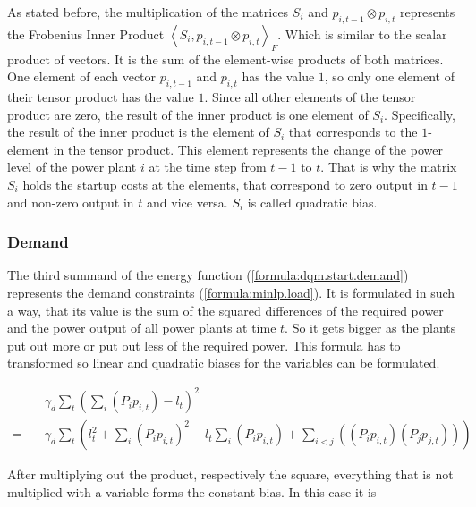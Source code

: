 As stated before, the multiplication of the matrices $S_i$ and $p_{i, t-1} \otimes p_{i, t}$ represents the Frobenius Inner Product $\left\langle S_i, p_{i, t-1} \otimes p_{i, t} \right\rangle_F$.
Which is similar to the scalar product of vectors.
It is the sum of the element-wise products of both matrices.
One element of each vector $p_{i, t-1}$ and $p_{i, t}$ has the value $1$, so only one element of their tensor product has the value $1$.
Since all other elements of the tensor product are zero, the result of the inner product is one element of $S_i$.
Specifically, the result of the inner product is the element of $S_i$ that corresponds to the $1$-element in the tensor product.
This element represents the change of the power level of the power plant $i$ at the time step from $t-1$ to $t$.
That is why the matrix $S_i$ holds the startup costs at the elements, that correspond to zero output in $t-1$ and non-zero output in $t$ and vice versa.
$S_i$ is called quadratic bias.

\subsubsection{Demand}

The third summand of the energy function (\ref{formula:dqm.start.demand}) represents the demand constraints (\ref{formula:minlp.load}).
It is formulated in such a way, that its value is the sum of the squared differences of the required power and the power output of all power plants at time $t$.
So it gets bigger as the plants put out more or put out less of the required power.
This formula has to transformed so linear and quadratic biases for the variables can be formulated.

\begin{subequations}
\begin{align}
  & \gamma_d \sum_t \left( \sum_i \left( P_i p_{i, t} \right) - l_t \right)^2 \\
  = \quad & \gamma_d \sum_t \left(
    l_t^2
    + \sum_i \left( P_i p_{i, t} \right)^2
    - l_t \sum_i \left( P_i p_{i, t} \right)
    + \sum_{i < j} \left( \left( P_i p_{i, t} \right) \left( P_j p_{j, t} \right) \right) \right)
    \label{formula:dqm.demand.multiplied_out}
\end{align}
\end{subequations}

After multiplying out the product, respectively the square, everything that is not multiplied with a variable forms the constant bias.
In this case it is

